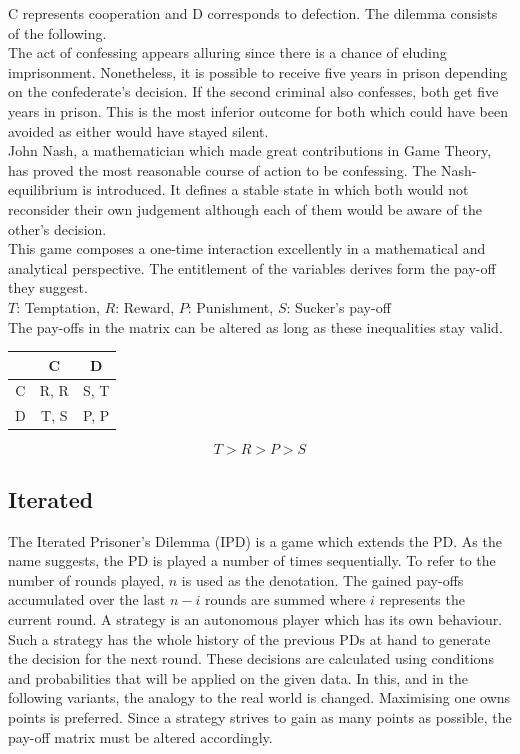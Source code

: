 \documentclass[11pt]{article}
\begin{document}
\noindent
C represents cooperation and D corresponds to defection. 
The dilemma consists of the following.\\
The act of confessing appears alluring since there is a chance of eluding imprisonment.
Nonetheless, it is possible to receive five years in prison depending on the confederate's decision.
If the second criminal also confesses, both get five years in prison. 
This is the most inferior outcome for both which could have been avoided as either would have stayed silent.\\
John Nash, a mathematician which made great contributions in Game Theory, has proved the most reasonable course of action to be confessing.
The Nash-equilibrium is introduced. 
It defines a stable state in which both would not reconsider their own judgement although each of them would be aware of the other's decision.\\
This game composes a one-time interaction excellently in a mathematical and analytical perspective. 
The entitlement of the variables derives form the pay-off they suggest.\\
$T$: Temptation,
$R$: Reward,
$P$: Punishment,
$S$: Sucker's pay-off\\
The pay-offs in the matrix can be altered as long as these inequalities stay valid.

\begin{center}
\begin{tabular}{ c|c|c }
   & C & D \\ 
   \hline
 C & R, R & S, T\\  
   \hline
 D & T, S & P, P
\end{tabular}
\end{center}

$$T > R > P > S$$

\subsection{Iterated}
		
The Iterated Prisoner's Dilemma (IPD) is a game which extends the PD. 
As the name suggests, the PD is played a number of times sequentially. 
To refer to the number of rounds played, $n$ is used as the denotation. 
The gained pay-offs accumulated over the last $n-i$ rounds are summed where $i$ represents the current round.
A strategy is an autonomous player which has its own behaviour.
Such a strategy has the whole history of the previous PDs at hand to generate the decision for the next round.
These decisions are calculated using conditions and probabilities that will be applied on the given data.
In this, and in the following variants, the analogy to the real world is changed.
Maximising one owns points is preferred.
Since a strategy strives to gain as many points as possible, the pay-off matrix must be altered accordingly.\\
\end{document}
